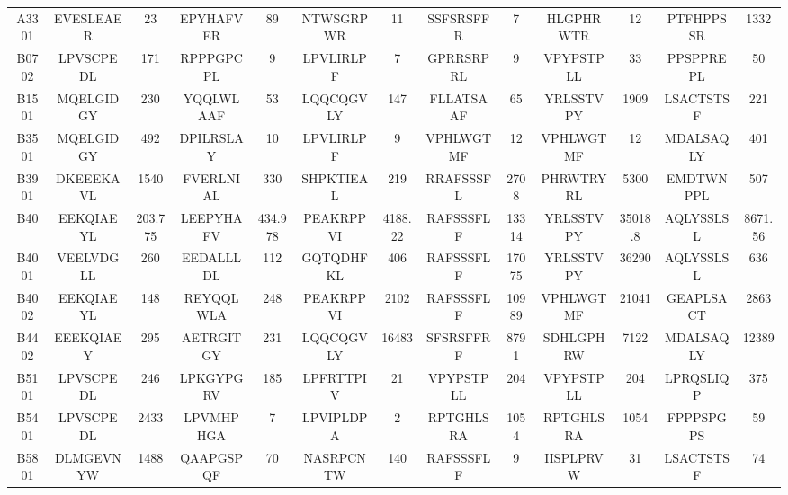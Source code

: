 \begin{table}[htp]
\begin{center}
\begin{sideways}
{\begin{tabulary}{1.5\textwidth}{|c|c|c|c|c|c|c|c|c|c|c|c|c|}
A3301 & EVESLEAER & 23 & EPYHAFVER & 89 & NTWSGRPWR & 11 & SSFSRSFFR & 7 & HLGPHRWTR & 12 & PTFHPPSSR & 1332\\
B0702 & LPVSCPEDL & 171 & RPPPGPCPL & 9 & LPVLIRLPF & 7 & GPRRSRPRL & 9 & VPYPSTPLL & 33 & PPSPPREPL & 50\\
B1501 & MQELGIDGY & 230 & YQQLWLAAF & 53 & LQQCQGVLY & 147 & FLLATSAAF & 65 & YRLSSTVPY & 1909 & LSACTSTSF & 221\\
B3501 & MQELGIDGY & 492 & DPILRSLAY & 10 & LPVLIRLPF & 9 & VPHLWGTMF & 12 & VPHLWGTMF & 12 & MDALSAQLY & 401\\
B3901 & DKEEEKAVL & 1540 & FVERLNIAL & 330 & SHPKTIEAL & 219 & RRAFSSSFL & 2708 & PHRWTRYRL & 5300 & EMDTWNPPL & 507\\
B40 & EEKQIAEYL & 203.775 & LEEPYHAFV & 434.978 & PEAKRPPVI & 4188.22 & RAFSSSFLF & 13314 & YRLSSTVPY & 35018.8 & AQLYSSLSL & 8671.56\\
B4001 & VEELVDGLL & 260 & EEDALLLDL & 112 & GQTQDHFKL & 406 & RAFSSSFLF & 17075 & YRLSSTVPY & 36290 & AQLYSSLSL & 636\\
B4002 & EEKQIAEYL & 148 & REYQQLWLA & 248 & PEAKRPPVI & 2102 & RAFSSSFLF & 10989 & VPHLWGTMF & 21041 & GEAPLSACT & 2863\\
B4402 & EEEKQIAEY & 295 & AETRGITGY & 231 & LQQCQGVLY & 16483 & SFSRSFFRF & 8791 & SDHLGPHRW & 7122 & MDALSAQLY & 12389\\
B5101 & LPVSCPEDL & 246 & LPKGYPGRV & 185 & LPFRTTPIV & 21 & VPYPSTPLL & 204 & VPYPSTPLL & 204 & LPRQSLIQP & 375\\
B5401 & LPVSCPEDL & 2433 & LPVMHPHGA & 7 & LPVIPLDPA & 2 & RPTGHLSRA & 1054 & RPTGHLSRA & 1054 & FPPPSPGPS & 59\\
B5801 & DLMGEVNYW & 1488 & QAAPGSPQF & 70 & NASRPCNTW & 140 & RAFSSSFLF & 9 & IISPLPRVW & 31 & LSACTSTSF & 74 \bigstrut[b] \\
\hline
\end{tabulary}
}
\end{sideways}
\end{center}
\end{table}


